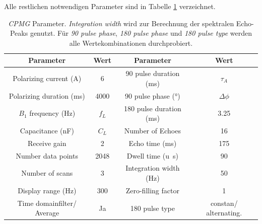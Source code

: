 \documentclass[../main.tex]{subfiles}
\begin{document}
        Alle restlichen notwendigen Parameter sind in Tabelle \ref{tab:DurchfuehrungTeil10Parameter} verzeichnet.
        \begin{table}[H]
            \centering
            \begin{tabular}{cc|cc}
                \textbf{Parameter} & \textbf{Wert} & \textbf{Parameter} & \textbf{Wert}  \\\hline\hline
                Polarizing current (\si{\ampere}) & 6 & 90 pulse duration (\si{\milli\second}) & $\tau_A$\\\hline
                Polarizing duration (\si{\milli\second}) & 4000 & 90 pulse phase (\si{\degree}) & $\Delta\phi$\\\hline
                $B_1$ frequency (\si{\hertz}) & $f_L$ & 180 pulse duration (\si{\milli\second}) & \num{3.25}\\\hline
                Capacitance (\si{\nano\farad}) & $C_L$ & Number of Echoes & 16\\\hline
                Receive gain & 2 & Echo time (\si{\milli\second}) & 175\\\hline
                Number data points & 2048 & Dwell time (\si{u\second}) & 90\\\hline
                Number of scans & 3 & Integration width (\si{\hertz}) & 50\\\hline 
                Display range (\si{\hertz}) & 300 &  Zero-filling factor & 1\\\hline
                Time domainfilter/ Average & Ja & 180 pulse type & constan/ alternating.
            \end{tabular}
            \caption{\textit{CPMG} Parameter. \textit{Integration width} wird zur Berechnung der spektralen Echo-Peaks genutzt. Für \textit{90 pulse phase}, \textit{180 pulse phase} und \textit{180 pulse type} werden alle Wertekombinationen durchprobiert.}
            \label{tab:DurchfuehrungTeil10Parameter}
        \end{table}
\end{document}
